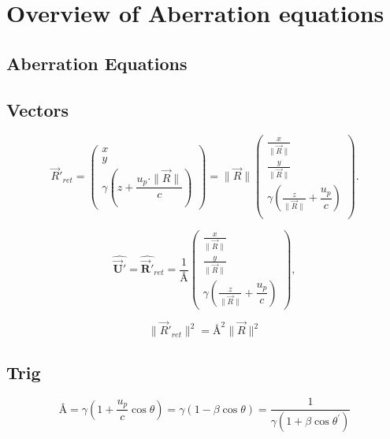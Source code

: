 \appendix
\chapter{Overview of Aberration equations}

\section{Aberration Equations}
\section{Vectors}
\begin{equation}%
\label{retarded displacement 2}
    \Vec{R}'_{ret}= \begin{pmatrix}
    x\\ y \\ \gamma \left(z + \dfrac{u_p \cdot \|\vec{R}\|}{c}\right)
    \end{pmatrix} = \|\vec{R}\|\begin{pmatrix}
    \frac{x}{\|\vec{R}\|}\\ \frac{y}{\|\vec{R}\|} \\ \gamma \left( \frac{z}{\|\vec{R}\|} + \dfrac{u_p}{c} \right)\\
    \end{pmatrix}.
\end{equation}%

\begin{equation}%
\label{eq: unit retarded velocity 2}
    \hat{\mathbf{\vec{U}'}} = \hat{\mathbf{\vec{R}'}}_{ret} = \dfrac{1}{\text{\AA}} \begin{pmatrix}
    \frac{x}{\|\vec{R}\|}\\ \frac{y}{\|\vec{R}\|} \\ \gamma \left( \frac{z}{\|\vec{R}\|} + \dfrac{u_p}{c} \right)
    \end{pmatrix},
\end{equation}%

\begin{equation}%
\label{eq: field displacement transform 2}
    \|\Vec{R}'_{ret}\|^2 = \text{\AA}^2 \|\vec{R}\|^2
\end{equation}%

\section{Trig}
\begin{equation}%
    \text{\AA} = \gamma\left(1+\dfrac{u_p}{c}\cos\theta\right) = \gamma\left(1-\beta\cos\theta\right) = \frac{1}{\gamma\left(1+\beta\cos\theta^{'}\right)}
\end{equation}%


